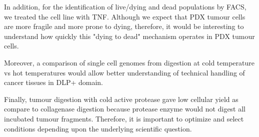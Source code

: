 In addition, for the identification of live/dying and dead populations by FACS, we treated the cell line with TNF\textalpha. Although we expect that PDX tumour cells are more fragile and more prone to dying, therefore, it would be interesting to understand how quickly this "dying to dead" mechanism operates in PDX tumour cells. 

Moreover, a comparison of single cell genomes from digestion at cold temperature vs hot temperatures would allow better understanding of technical handling of cancer tissues in DLP+ domain.

Finally, tumour digestion with cold active protease gave low cellular yield as compare to collagenase digestion because protease enzyme would not digest all incubated tumour fragments. Therefore, it is important to optimize and select conditions depending upon the underlying scientific question.



